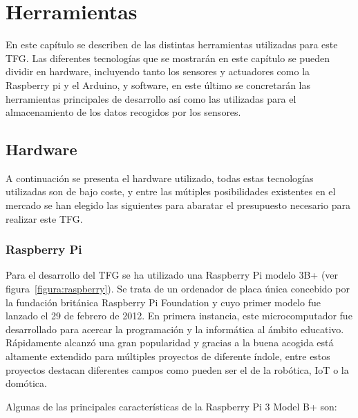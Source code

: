 \documentclass[a4paper, 12pt, oneside]{book}
\begin{document}

\cleardoublepage %
\chapter{Herramientas} 
\label{chap:herramientas}

En este capítulo se  describen de las distintas herramientas utilizadas para este TFG. Las diferentes tecnologías que se mostrarán en este capítulo se pueden dividir en hardware, incluyendo tanto los sensores y actuadores como la Raspberry pi y el Arduino, y software, en este último se concretarán las herramientas principales de desarrollo así como las utilizadas para el almacenamiento de los datos recogidos por los sensores.


\section{Hardware}
\label{sec:hardware}

A continuación se presenta el hardware utilizado, todas estas tecnologías utilizadas son de bajo coste, y entre las mútiples posibilidades existentes en el mercado se han elegido las siguientes para abaratar el presupuesto necesario para realizar este TFG.

\subsection{Raspberry Pi}
\label{subsec:raspberry pi}

Para el desarrollo del TFG se ha utilizado una Raspberry Pi modelo 3B+ (ver figura~\ref{figura:raspberry}). Se trata de un ordenador de placa única concebido por la fundación británica Raspberry Pi Foundation y cuyo primer modelo fue lanzado el 29 de febrero de 2012. En primera instancia, este microcomputador fue desarrollado para acercar la programación y la informática al ámbito educativo. Rápidamente alcanzó una gran popularidad y gracias a la buena acogida está altamente extendido para múltiples proyectos de diferente índole, entre estos proyectos destacan diferentes campos como pueden ser el de la robótica, IoT o la domótica.

Algunas de las principales características de la Raspberry Pi 3 Model B+ son:
\end{document}
